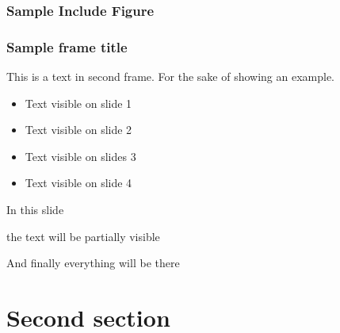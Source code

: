 \documentclass[10pt]{beamer}
\begin{document}
\begin{frame}
    \frametitle{Sample Include Figure}
    \begin{figure}[h]
        \centering

    \end{figure}
\end{frame}

\begin{frame}
    \frametitle{Sample frame title}
    This is a text in second frame. For the sake of showing an example.

    \begin{itemize}
        \item<1-> Text visible on slide 1
        \item<2-> Text visible on slide 2
        \item<3> Text visible on slides 3
        \item<4-> Text visible on slide 4
    \end{itemize}
\end{frame}



\begin{frame}
    In this slide \pause

    the text will be partially visible \pause

    And finally everything will be there
\end{frame}

\section{Second section}
\end{document}

